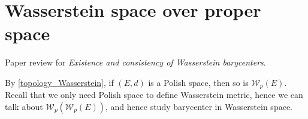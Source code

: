 \chapter{Wasserstein space over proper space}

Paper review for \emph{Existence and consistency of Wasserstein barycenters}\cite{le2017existence}.

By \cref{topology_Wasserstein}, if $(E,d)$ is a Polish space, then so is $\mathcal{W}_p(E)$. Recall that we only need Polish space to define Wasserstein metric, hence we can talk about $\mathcal{W}_p(\mathcal{W}_p(E))$, and hence study barycenter in Wasserstein space.


